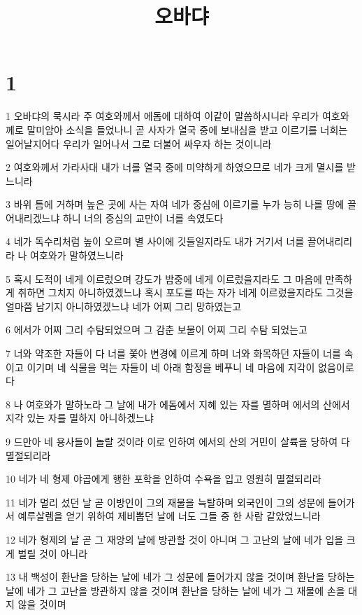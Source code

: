 

\title{오바댜}


\chapter{1}

\par 1 오바댜의 묵시라 주 여호와께서 에돔에 대하여 이같이 말씀하시니라 우리가 여호와께로 말미암아 소식을 들었나니 곧 사자가 열국 중에 보내심을 받고 이르기를 너희는 일어날지어다 우리가 일어나서 그로 더불어 싸우자 하는 것이니라
\par 2 여호와께서 가라사대 내가 너를 열국 중에 미약하게 하였으므로 네가 크게 멸시를 받느니라
\par 3 바위 틈에 거하며 높은 곳에 사는 자여 네가 중심에 이르기를 누가 능히 나를 땅에 끌어내리겠느냐 하니 너의 중심의 교만이 너를 속였도다
\par 4 네가 독수리처럼 높이 오르며 별 사이에 깃들일지라도 내가 거기서 너를 끌어내리리라 나 여호와가 말하였느니라
\par 5 혹시 도적이 네게 이르렀으며 강도가 밤중에 네게 이르렀을지라도 그 마음에 만족하게 취하면 그치지 아니하였겠느냐 혹시 포도를 따는 자가 네게 이르렀을지라도 그것을 얼마쯤 남기지 아니하였겠느냐 네가 어찌 그리 망하였는고
\par 6 에서가 어찌 그리 수탐되었으며 그 감춘 보물이 어찌 그리 수탐 되었는고
\par 7 너와 약조한 자들이 다 너를 쫓아 변경에 이르게 하며 너와 화목하던 자들이 너를 속이고 이기며 네 식물을 먹는 자들이 네 아래 함정을 베푸니 네 마음에 지각이 없음이로다
\par 8 나 여호와가 말하노라 그 날에 내가 에돔에서 지혜 있는 자를 멸하며 에서의 산에서 지각 있는 자를 멸하지 아니하겠느냐
\par 9 드만아 네 용사들이 놀랄 것이라 이로 인하여 에서의 산의 거민이 살륙을 당하여 다 멸절되리라
\par 10 네가 네 형제 야곱에게 행한 포학을 인하여 수욕을 입고 영원히 멸절되리라
\par 11 네가 멀리 섰던 날 곧 이방인이 그의 재물을 늑탈하며 외국인이 그의 성문에 들어가서 예루살렘을 얻기 위하여 제비뽑던 날에 너도 그들 중 한 사람 같았었느니라
\par 12 네가 형제의 날 곧 그 재앙의 날에 방관할 것이 아니며 그 고난의 날에 네가 입을 크게 벌릴 것이 아니라
\par 13 내 백성이 환난을 당하는 날에 네가 그 성문에 들어가지 않을 것이며 환난을 당하는 날에 네가 그 고난을 방관하지 않을 것이며 환난을 당하는 날에 네가 그 재물에 손을 대지 않을 것이며
